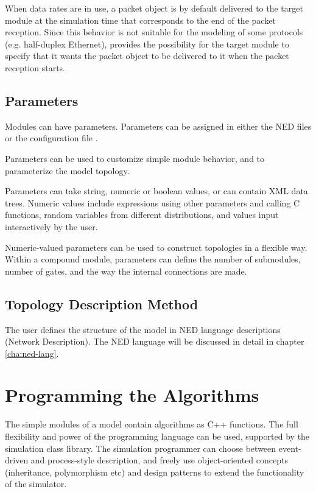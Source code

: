 When data rates are in use, a packet object is by default delivered to the
target module at the simulation time that corresponds to the end of the
packet reception. Since this behavior is not suitable for the modeling of
some protocols (e.g. half-duplex Ethernet), {\opp} provides the possibility
for the target module to specify that it wants the packet object to be
delivered to it when the packet reception starts.


\subsection{Parameters}
\label{sec:overview:parameters}

Modules can have parameters. Parameters can be assigned  in either
the NED files or the configuration file .

Parameters can be used to customize simple module behavior,
and to parameterize the model topology.

Parameters can take string, numeric or boolean values, or can
contain XML data trees. Numeric values include expressions using
other parameters and calling C functions, random variables from
different distributions, and values input interactively by the user.

Numeric-valued parameters can be used to construct topologies in a
flexible way. Within a compound module, parameters can define the
number of submodules, number of gates, and the way the internal
connections are made.


\subsection{Topology Description Method}
\label{sec:overview:topology-description-method}

The user defines the structure of the model in NED language descriptions
(Network Description). The NED language will be discussed in detail
in chapter \ref{cha:ned-lang}.


\section{Programming the Algorithms}
\label{sec:overview:programmable-using-cplusplus}

The simple modules of a model contain algorithms
as C++ functions.
The full flexibility and power of the programming language can
be used, supported by the {\opp} simulation class library.
The simulation programmer can choose between event-driven and process-style
description, and freely use object-oriented concepts
(inheritance, polymorphism etc) and design patterns to extend the
functionality of the simulator.

